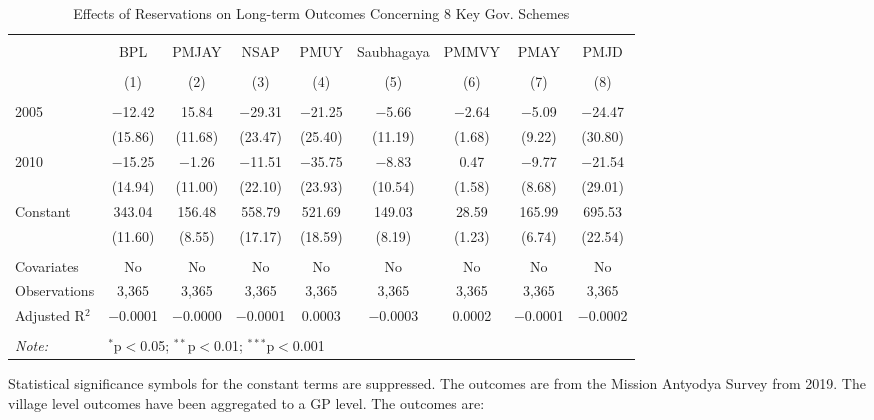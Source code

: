 \begin{table}[!htbp]
\centering
\begin{threeparttable}

  \caption{Effects of Reservations on Long-term Outcomes Concerning 8 Key Gov. Schemes} 
  \label{raj_shrug_schemes_05_10} 
\scriptsize 
\begin{tabular}{@{\extracolsep{0pt}}lcccccccc} 
\\[-1.8ex]\hline 
\hline \\[-1.8ex] 
 & BPL & PMJAY & NSAP & PMUY & Saubhagaya & PMMVY & PMAY & PMJD \\ 
\\[-1.8ex] & (1) & (2) & (3) & (4) & (5) & (6) & (7) & (8)\\ 
\hline \\[-1.8ex] 
 2005 & $-$12.42 & 15.84 & $-$29.31 & $-$21.25 & $-$5.66 & $-$2.64 & $-$5.09 & $-$24.47 \\ 
  & (15.86) & (11.68) & (23.47) & (25.40) & (11.19) & (1.68) & (9.22) & (30.80) \\ 
  2010 & $-$15.25 & $-$1.26 & $-$11.51 & $-$35.75 & $-$8.83 & 0.47 & $-$9.77 & $-$21.54 \\ 
  & (14.94) & (11.00) & (22.10) & (23.93) & (10.54) & (1.58) & (8.68) & (29.01) \\ 
  Constant & 343.04 & 156.48 & 558.79 & 521.69 & 149.03 & 28.59 & 165.99 & 695.53 \\ 
  & (11.60) & (8.55) & (17.17) & (18.59) & (8.19) & (1.23) & (6.74) & (22.54) \\ 
 \hline \\[-1.8ex] 
Covariates & No & No & No & No & No & No & No & No \\ 
Observations & 3,365 & 3,365 & 3,365 & 3,365 & 3,365 & 3,365 & 3,365 & 3,365 \\ 
Adjusted R$^{2}$ & $-$0.0001 & $-$0.0000 & $-$0.0001 & 0.0003 & $-$0.0003 & 0.0002 & $-$0.0001 & $-$0.0002 \\ 
\hline 
\hline \\[-1.8ex] 
\textit{Note:}  & \multicolumn{8}{l}{$^{*}$p$<$0.05; $^{**}$p$<$0.01; $^{***}$p$<$0.001} \\ 
\end{tabular} 
\begin{tablenotes}[flushleft]
\scriptsize
\item Statistical significance symbols for the constant terms are suppressed. The outcomes are from the Mission Antyodya Survey from 2019. 
                   The village level outcomes have been aggregated to a GP level. The outcomes are:

\end{tablenotes}
\end{threeparttable}
\end{table}
